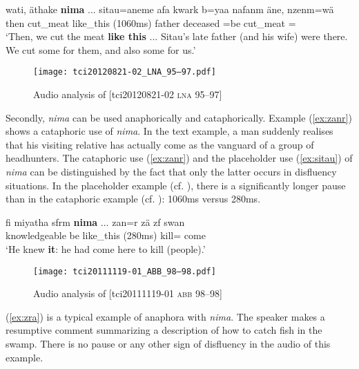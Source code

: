 \documentclass[output=paper,colorlinks,citecolor=brown]{langscibook}
\begin{document}
\ea \label{ex:sitau}
    \gll wati, äthake \textbf{nima} ... sitau=aneme afa kwark b=yaa nafanm äne, nzenm=wä\\
    then cut\_meat like\_this (1060ms)  father deceased =be  cut\_meat =\\
    \glt `Then, we cut the meat \textbf{like this} ... Sitau's late father (and his wife) were there. We cut some for them, and also some for us.' 
\z
\begin{figure}
    \texttt{[image: tci20120821-02\_LNA\_95–97.pdf]}
    \caption{Audio analysis of [tci20120821-02 \textsc{lna} 95--97]}
    \label{fig:doehler:sitau}
\end{figure}

Secondly, \textit{nima} can be used anaphorically and cataphorically. Example (\ref{ex:zanr}) shows a cataphoric use of \textit{nima}. In the text example, a man suddenly realises that his visiting relative has actually come as the vanguard of a group of headhunters. The cataphoric use (\ref{ex:zanr}) and the placeholder use (\ref{ex:sitau}) of \textit{nima} can be distinguished by the fact that only the latter occurs in disfluency situations. In the placeholder example (cf. ), there is a significantly longer pause than in the cataphoric example (cf. ): 1060ms versus 280ms.

\ea \label{ex:zanr}
    \gll fi miyatha sfrm \textbf{nima} ... zan=r zä zf swan\\
     knowledgeable be like\_this (280ms) kill=   come\\
    \glt `He knew \textbf{it}: he had come here to kill (people).' 
\z
\begin{figure}
    \texttt{[image: tci20111119-01\_ABB\_98–98.pdf]}
    \caption{Audio analysis of [tci20111119-01 \textsc{abb} 98--98]}
    \label{fig:doehler:zanr}
\end{figure}

(\ref{ex:zra}) is a typical example of anaphora with \textit{nima}. The speaker makes a resumptive comment summarizing a description of how to catch fish in the swamp. There is no pause or any other sign of disfluency in the audio of this example.
\end{document}
